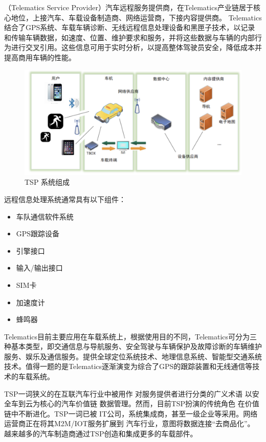 （Telematics Service Provider）汽车远程服务提供商，在Telematics产业链居于核心地位，上接汽车、车载设备制造商、网络运营商，下接内容提供商。
 Telematics结合了GPS系统、车载车辆诊断、无线远程信息处理设备和黑匣子技术，以记录和传输车辆数据，如速度、位置、维护要求和服务，并将这些数据与车辆的内部行为进行交叉引用。这些信息可用于实时分析，以提高整体驾驶员安全，降低成本并提高商用车辆的性能。
 \begin{figure}
    \centering
    \includegraphics[scale=0.6]{resources/img/i2.png}
    \caption{TSP 系统组成}
  \end{figure}

  远程信息处理系统通常具有以下组件：
  \begin{itemize}
    \item 车队通信软件系统
    \item GPS跟踪设备
    \item 引擎接口
    \item 输入/输出接口
    \item SIM卡
    \item 加速度计
    \item 蜂鸣器
  \end{itemize}

Telematics目前主要应用在车载系统上，根据使用目的不同，Telematics可分为三种基本类型，即交通信息与导航服务、安全驾驶与车辆保护及故障诊断的车辆维护服务、娱乐及通信服务。提供全球定位系统技术、地理信息系统、智能型交通系统技术。值得一题的是Telematics逐渐演变为综合了GPS的跟踪装置和无线通信等技术的车载系统。

TSP一词狭义的在互联汽车行业中被用作
对服务提供者进行分类的广义术语
以安全车到云为核心的汽车价值链
数据管理。然而，目前TSP扮演的传统角色
在价值链中不断进化。TSP一词已被
IT公司，系统集成商，甚至一级企业等采用。网络
运营商正在将其M2M/IOT服务扩展到
汽车行业，意图将数据连接“去商品化”。
越来越多的汽车制造商通过TSP创造和集成更多的车载部件。

